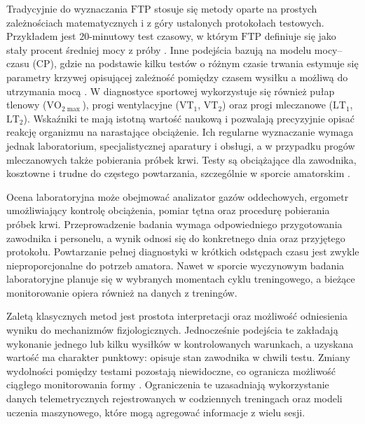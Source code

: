 Tradycyjnie do wyznaczania $\mathrm{FTP}$ stosuje się metody oparte na prostych zależnościach matematycznych i z góry ustalonych protokołach testowych.
Przykładem jest $20$-minutowy test czasowy, w którym $\mathrm{FTP}$ definiuje się jako stały procent średniej mocy z próby \parencite{allen2019power,sitko2023_ac20to60_update,phasescycling2023_ftp_variability}.
Inne podejścia bazują na modelu mocy--czasu ($\mathrm{CP}$), gdzie na podstawie kilku testów o różnym czasie trwania estymuje się parametry krzywej opisującej zależność pomiędzy czasem wysiłku a możliwą do utrzymania mocą \parencite{denham2020predictftp}.
W diagnostyce sportowej wykorzystuje się również pułap tlenowy ($\text{VO}_{2\max}$), progi wentylacyjne ($\text{VT}_1$, $\text{VT}_2$) oraz progi mleczanowe ($\text{LT}_1$, $\text{LT}_2$). Wskaźniki te mają istotną wartość naukową i pozwalają precyzyjnie opisać reakcję organizmu na narastające obciążenie. Ich regularne wyznaczanie wymaga jednak laboratorium, specjalistycznej aparatury i obsługi, a w przypadku progów mleczanowych także pobierania próbek krwi. Testy są obciążające dla zawodnika, kosztowne i trudne do częstego powtarzania, szczególnie w sporcie amatorskim \parencite{borszcz2018ftp,karsten2021cpftp}.

Ocena laboratoryjna może obejmować analizator gazów oddechowych, ergometr umożliwiający kontrolę obciążenia, pomiar tętna oraz procedurę pobierania próbek krwi. Przeprowadzenie badania wymaga odpowiedniego przygotowania zawodnika i personelu, a wynik odnosi się do konkretnego dnia oraz przyjętego protokołu. Powtarzanie pełnej diagnostyki w krótkich odstępach czasu jest zwykle nieproporcjonalne do potrzeb amatora. Nawet w sporcie wyczynowym badania laboratoryjne planuje się w wybranych momentach cyklu treningowego, a bieżące monitorowanie opiera również na danych z treningów.

Zaletą klasycznych metod jest prostota interpretacji oraz możliwość odniesienia wyniku do mechanizmów fizjologicznych.
Jednocześnie podejścia te zakładają wykonanie jednego lub kilku wysiłków w kontrolowanych warunkach, a uzyskana wartość ma charakter punktowy: opisuje stan zawodnika w chwili testu.
Zmiany wydolności pomiędzy testami pozostają niewidoczne, co ogranicza możliwość ciągłego monitorowania formy \parencite{denham2020predictftp,phasescycling2023_ftp_variability}.
Ograniczenia te uzasadniają wykorzystanie danych telemetrycznych rejestrowanych w codziennych treningach oraz modeli uczenia maszynowego, które mogą agregować informacje z wielu sesji.

